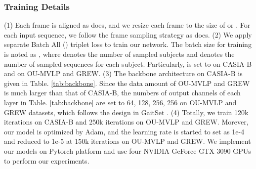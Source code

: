 \documentclass[journal]{IEEEtran}
\begin{document}
\subsubsection{Training Details}
(1) Each frame is aligned as \cite{takemura2018multi} does, and we resize each frame to the size of  or . For each input sequence, we follow the frame sampling strategy as \cite{fan2020gaitpart} does. (2) We apply separate Batch All () triplet loss to train our network. The batch size for training is noted as , where  denotes the number of sampled subjects and  denotes the number of sampled sequences for each subject. Particularly,  is set to  on CASIA-B and  on OU-MVLP and GREW. (3) The backbone architecture on CASIA-B is given in Table. \ref{tab:backbone}. Since the data amount of OU-MVLP and GREW is much larger than that of CASIA-B, the numbers of output channels of each layer in Table. \ref{tab:backbone} are set to 64, 128, 256, 256 on OU-MVLP and GREW datasets, which follows the design in GaitSet \cite{chao2021gaitset}. (4) Totally, we train 120k iterations on CASIA-B and 250k iterations on OU-MVLP and GREW. Morever, our model is optimized by Adam, and the learning rate is started to set as 1e-4 and reduced to 1e-5 at 150k iterations on OU-MVLP and GREW. We implement our models on Pytorch \cite{paszke2017automatic} platform and use four NVIDIA GeForce GTX 3090 GPUs to perform our experiments.
\end{document}
